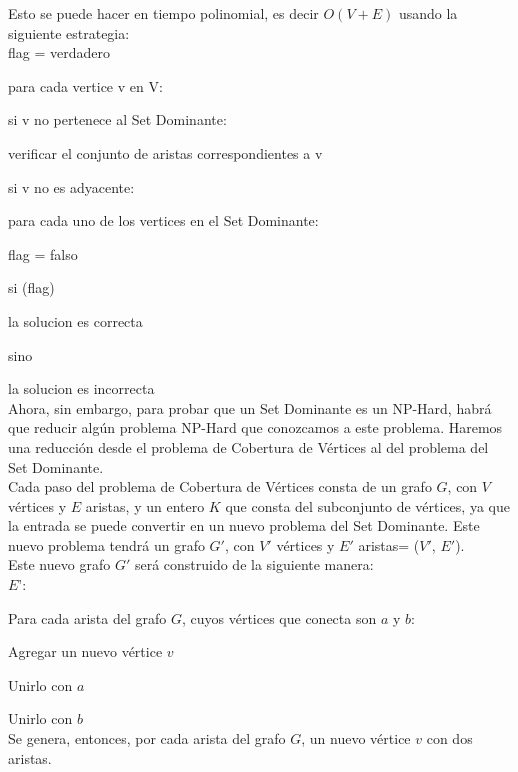 Esto se puede hacer en tiempo polinomial, es decir $O(V + E)$ usando la siguiente estrategia:\\

flag = verdadero

para cada vertice v en V:

\>\>\>\>\>     si v no pertenece al Set Dominante:

\>\>\>\>\>     \>\>\>\>\>     verificar el conjunto de aristas correspondientes a v

\>\>\>\>\>     \>\>\>\>\>     si v no es adyacente:

\>\>\>\>\>     \>\>\>\>\>     \>\>\>\>\>     para cada uno de los vertices en el Set Dominante: 

\>\>\>\>\>     \>\>\>\>\>     \>\>\>\>\>     \>\>\>\>\>     flag = falso
           
si (flag)

\>\>\>\>\>     la solucion es correcta

sino

\>\>\>\>\>     la solucion es incorrecta\\


Ahora, sin embargo, para probar que un Set Dominante es un NP-Hard, habrá que reducir algún problema NP-Hard que conozcamos a este problema. Haremos una reducción desde el problema de Cobertura de Vértices al del problema del Set Dominante.\\

Cada paso del problema de Cobertura de Vértices consta de un grafo $G$, con $V$ vértices y $E$ aristas, y un entero $K$ que consta del subconjunto de vértices, ya que la entrada se puede convertir en un nuevo problema del Set Dominante. Este nuevo problema tendrá un grafo $G'$, con $V'$ vértices y $E'$ aristas= ($V'$, $E'$).\\

Este nuevo grafo $G'$ será construido de la siguiente manera:\\

\textbf{$E’$}:

\>\>\>\>\>     Para cada arista del grafo $G$, cuyos vértices que conecta son $a$ y $b$:

\>\>\>\>\>     \>\>\>\>\>     Agregar un nuevo vértice $v$

\>\>\>\>\>     \>\>\>\>\>     Unirlo con $a$

\>\>\>\>\>     \>\>\>\>\>     Unirlo con $b$\\

Se genera, entonces, por cada arista del grafo $G$, un nuevo vértice $v$ con dos aristas.\\

